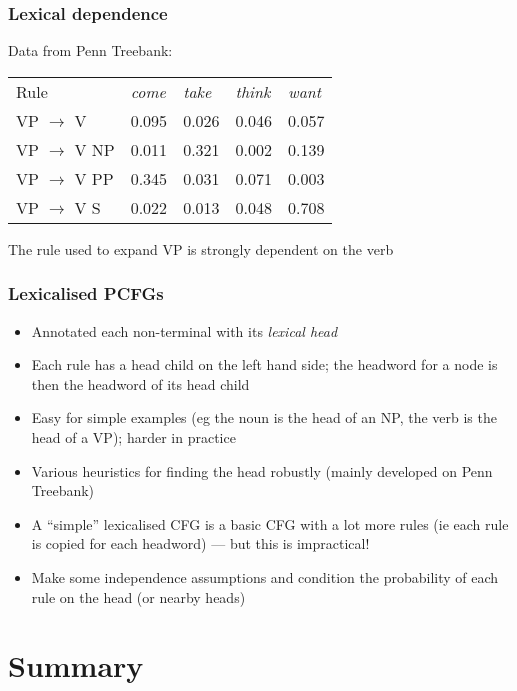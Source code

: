 \begin{frame}
  \frametitle{Lexical dependence}
  Data from Penn Treebank:

  \medskip
  \begin{tabular}{lllll}
    Rule & \emph{come} & \emph{take} & \emph{think} & \emph{want} \\
    VP $\rightarrow$ V & 0.095 & 0.026 & 0.046 & 0.057\\
    VP $\rightarrow$ V NP & 0.011 & 0.321 & 0.002 & 0.139 \\
    VP $\rightarrow$ V PP & 0.345  & 0.031 & 0.071 & 0.003 \\
    VP $\rightarrow$ V S & 0.022 & 0.013 & 0.048 & 0.708 \\
  \end{tabular}

  \medskip
  The rule used to expand VP is strongly dependent on the verb
\end{frame}

\begin{frame}
  \frametitle{Lexicalised PCFGs}
  \begin{itemize}
  \item Annotated each non-terminal with its \emph{lexical head}
  \item Each rule has a head child on the left hand side;  the
    headword for a node is then the headword of its head child
  \item Easy for simple examples (eg the noun is the head of an NP,
    the verb is the head of a VP);  harder in
    practice
  \item Various heuristics for finding the head robustly (mainly
    developed on Penn Treebank)
  \item A ``simple'' lexicalised CFG is a basic CFG with a lot more
    rules (ie each rule is copied for each headword) --- but this is
    impractical!
  \item Make some independence assumptions and condition the
    probability of each rule on the head (or nearby heads)
  \end{itemize}
\end{frame}




\section{Summary}

